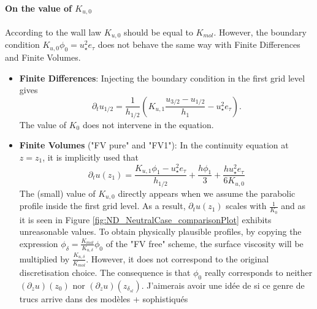 \paragraph{On the value of $K_{u,0}$}
\label{sec:ND_StratifiedCase_viscosity0_FVpure}
According to the wall law $K_{u,0}$ should be equal to $K_{mol}$.
However, the boundary condition $K_{u,0} \phi_0 = u_\star^2 e_\tau$
does not behave the same way with Finite Differences and Finite
Volumes.
\begin{itemize}
	\item \textbf{Finite Differences}:
Injecting the boundary condition in the first grid level gives
		\begin{equation}
			\partial_t u_{1/2} = \frac{1}{h_{1/2}}
			\left(K_{u,1}\frac{u_{3/2} - u_{1/2}}{h_1}
			 - u_\star^2 e_\tau \right).
		\end{equation}
The value of $K_0$ does not intervene in the equation.
\item \textbf{Finite Volumes} ("FV pure" and "FV1"):
In the continuity equation at $z=z_1$, it is implicitly used that
	\begin{equation}
		\partial_t u(z_1) =
		\frac{K_{u,1} \phi_1 - u_\star^2 e_\tau} {h_{1/2}}
		+ \frac{h \phi_1}{3}
		+ \frac{h u_\star^2 e_\tau}{6 K_{u,0}}
	\end{equation}
The (small) value of $K_{u,0}$ directly appears when we assume the
parabolic profile inside the first grid level.
As a result, $\partial_t u(z_1)$ scales with $\frac{1}{K_0}$ and
as it is seen in Figure \ref{fig:ND_NeutralCase_comparisonPlot}
exhibits unreasonable values.
To obtain physically plausible profiles,
by copying the expression $\phi_{\delta} = \frac{K_{mol}}{K_{u,\delta}}\phi_0$ of the "FV free" scheme, the surface
viscosity will be multiplied by $\frac{K_{u,\delta}}{K_{mol}}$.
However, it does not correspond to the original discretisation choice.
The consequence is that $\phi_0$ really corresponds
to neither $(\partial_z u)(z_0)$ nor $(\partial_z u)(z_{\delta_{sl}})$.
{\color{red} J'aimerais avoir une idée de si ce genre de trucs
		arrive dans des modèles + sophistiqués}
\end{itemize}

